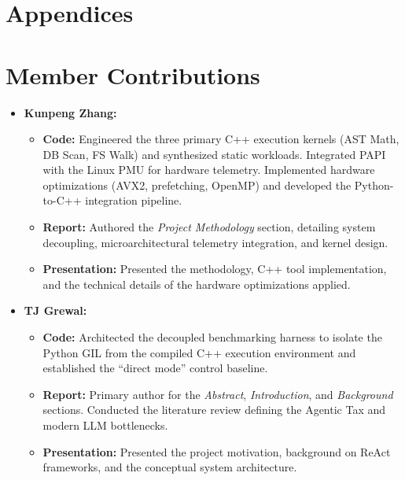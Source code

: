\documentclass[10pt, letterpaper]{article}
\begin{document}
\clearpage

\appendix
\section*{Appendices}
\section{Member Contributions}
\begin{itemize}
    \item \textbf{Kunpeng Zhang:}
    \begin{itemize}
        \item \textbf{Code:} Engineered the three primary C++ execution kernels (AST Math, DB Scan, FS Walk) and synthesized static workloads. Integrated PAPI with the Linux PMU for hardware telemetry. Implemented hardware optimizations (AVX2, prefetching, OpenMP) and developed the Python-to-C++ integration pipeline.
        \item \textbf{Report:} Authored the \textit{Project Methodology} section, detailing system decoupling, microarchitectural telemetry integration, and kernel design.
        \item \textbf{Presentation:} Presented the methodology, C++ tool implementation, and the technical details of the hardware optimizations applied.
    \end{itemize}

    \item \textbf{TJ Grewal:}
    \begin{itemize}
        \item \textbf{Code:} Architected the decoupled benchmarking harness to isolate the Python GIL from the compiled C++ execution environment and established the ``direct mode'' control baseline.
        \item \textbf{Report:} Primary author for the \textit{Abstract}, \textit{Introduction}, and \textit{Background} sections. Conducted the literature review defining the Agentic Tax and modern LLM bottlenecks.
        \item \textbf{Presentation:} Presented the project motivation, background on ReAct frameworks, and the conceptual system architecture.
    \end{itemize}


\end{itemize}
\end{document}
